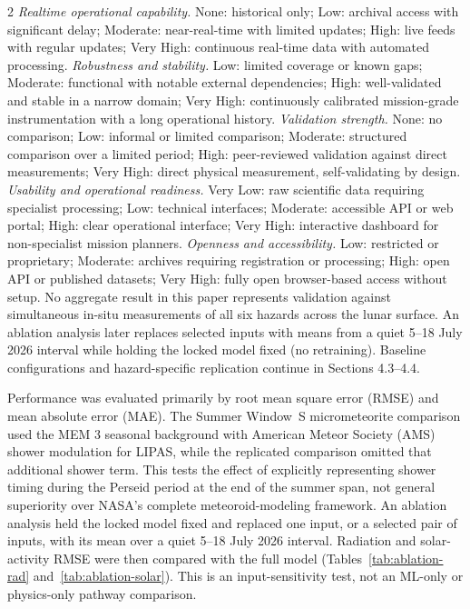 \begin{multicols}{2}
\textit{Realtime operational capability.} None: historical only; Low: archival access with significant delay; Moderate: near-real-time with limited updates; High: live feeds with regular updates; Very High: continuous real-time data with automated processing. 
\textit{Robustness and stability.} Low: limited coverage or known gaps; Moderate: functional with notable external dependencies; High: well-validated and stable in a narrow domain; Very High: continuously calibrated mission-grade instrumentation with a long operational history. 
\textit{Validation strength.} None: no comparison; Low: informal or limited comparison; Moderate: structured comparison over a limited period; High: peer-reviewed validation against direct measurements; Very High: direct physical measurement, self-validating by design. 
\textit{Usability and operational readiness.} Very Low: raw scientific data requiring specialist processing; Low: technical interfaces; Moderate: accessible API or web portal; High: clear operational interface; Very High: interactive dashboard for non-specialist mission planners. 
\textit{Openness and accessibility.} Low: restricted or proprietary; Moderate: archives requiring registration or processing; High: open API or published datasets; Very High: fully open browser-based access without setup. No aggregate result in this paper represents validation against simultaneous in-situ measurements of all six hazards across the lunar surface. An ablation analysis later replaces selected inputs with means from a quiet 5--18 July 2026 interval while holding the locked model fixed (no retraining). Baseline configurations and hazard-specific replication continue in Sections 4.3--4.4.

Performance was evaluated primarily by root mean square error (RMSE) and mean absolute error (MAE). The Summer Window~S micrometeorite comparison used the MEM 3 seasonal background with American Meteor Society (AMS) shower modulation for LIPAS, while the replicated comparison omitted that additional shower term. This tests the effect of explicitly representing shower timing during the Perseid period at the end of the summer span, not general superiority over NASA's complete meteoroid-modeling framework. An ablation analysis held the locked model fixed and replaced one input, or a selected pair of inputs, with its mean over a quiet 5--18 July 2026 interval. Radiation and solar-activity RMSE were then compared with the full model (Tables~\ref{tab:ablation-rad} and~\ref{tab:ablation-solar}). This is an input-sensitivity test, not an ML-only or physics-only pathway comparison.


\end{multicols}
